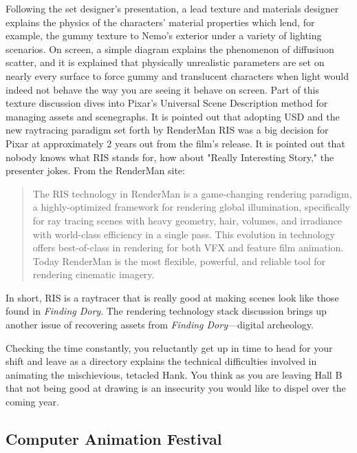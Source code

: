 \documentclass[../main.tex]{subfiles}
\begin{document}
Following the set designer's presentation, a lead texture and materials designer explains the physics of the characters' material properties which lend, for example, the gummy texture to Nemo's exterior under a variety of lighting scenarios. On screen, a simple diagram explains the phenomenon of diffusiuon scatter, and it is explained that physically unrealistic parameters are set on nearly every surface to force gummy and translucent characters when light would indeed not behave the way you are seeing it behave on screen. Part of this texture discussion dives into Pixar's Universal Scene Description method for managing assets and scenegraphs. It is pointed out that adopting USD and the new raytracing paradigm set forth by RenderMan RIS was a big decision for Pixar at approximately 2 years out from the film's release. It is pointed out that nobody knows what RIS stands for, how about "Really Interesting Story," the presenter jokes. From the RenderMan site:

\begin{quote}
The RIS technology in RenderMan is a game-changing rendering paradigm, a highly-optimized framework for rendering global illumination, specifically for ray tracing scenes with heavy geometry, hair, volumes, and irradiance with world-class efficiency in a single pass. This evolution in technology offers best-of-class in rendering for both VFX and feature film animation. Today RenderMan is the most flexible, powerful, and reliable tool for rendering cinematic imagery.  
\end{quote}

In short, RIS is a raytracer that is really good at making scenes look like those found in \textit{Finding Dory}. The rendering technology stack discussion brings up another issue of recovering assets from \textit{Finding Dory}---digital archeology.

Checking the time constantly, you reluctantly get up in time to head for your shift and leave as a directory explains the technical difficulties involved in animating the mischievious, tetacled Hank. You think as you are leaving Hall B that not being good at drawing is an insecurity you would like to dispel over the coming year.

\subsection{Computer Animation Festival}
\end{document}
